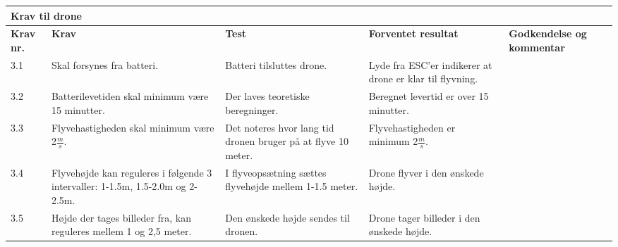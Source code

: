 \begin{sideways}
    \centering
    \begin{tabular}{|l|p{4.5 cm}|p{4.5 cm}|p{4.5 cm}|p{4.5 cm}|p{2 cm}|}
			\hline
			\multicolumn{5}{|l|}{\textbf{Krav til drone}}\\ \hline
			\textbf{Krav nr.} & \textbf{Krav} & \textbf{Test} & \textbf{Forventet \newline resultat} & 			
			\textbf{Godkendelse \newline og kommentar} \\ \hline
			
			3.1 & Skal forsynes fra batteri.
				& Batteri tilsluttes drone.
				& Lyde fra ESC'er indikerer at drone er klar til flyvning.
				& \\ \hline

			3.2 & Batterilevetiden skal minimum være 15 minutter.
				& Der laves teoretiske beregninger.
				& Beregnet levertid er over 15 minutter.
				&  \\ \hline
			
			3.3 & Flyvehastigheden skal minimum være 2$\frac{m}{s}$.
				& Det noteres hvor lang tid dronen bruger på at flyve 10 meter.
				& Flyvehastigheden er minimum 2$\frac{m}{s}$.
				& \\ \hline		
				
			3.4 & Flyvehøjde kan reguleres i følgende 3 intervaller: 1-1.5m, 1.5-2.0m og 2-2.5m.
				& I flyveopsætning sættes flyvehøjde mellem 1-1.5 meter.
				& Drone flyver i den ønskede højde.
				& \\ \hline	
				
			3.5 & Højde der tages billeder fra, kan reguleres mellem 1 og 2,5 meter.
				& Den ønskede højde sendes til dronen.
				& Drone tager billeder i den ønskede højde.
				& \\ \hline	
		\end{tabular}
	\label{tab:krav_1}
\end{sideways}

